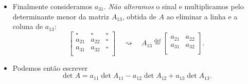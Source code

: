 \begin{itemize}
\begin{equation}
\end{equation}
\item Finalmente consideramos $a_{31}$. \textit{Não alteramos} o sinal e multiplicamos pelo determinante menor da matriz $A_{13}$, obtida de $A$ ao eliminar a linha e a coluna de $a_{13}$:
\begin{equation}
\begin{bmatrix}
\square & \square & \square \\
a_{21}  & a_{22}  & \square \\
a_{31}  & a_{32}  & \square \\
\end{bmatrix} \quad \rightsquigarrow \quad A_{13} \stackrel{\text{def}}{=}
\begin{bmatrix}
a_{21}  & a_{22} \\
a_{31}  & a_{32} \\
\end{bmatrix}.
\end{equation}
\item Podemos então escrever
\begin{equation}\label{detminor}
\boxed{\det A = a_{11} \det A_{11} - a_{12} \det A_{12} +  a_{13} \det A_{13}.}
\end{equation}
\end{itemize}


